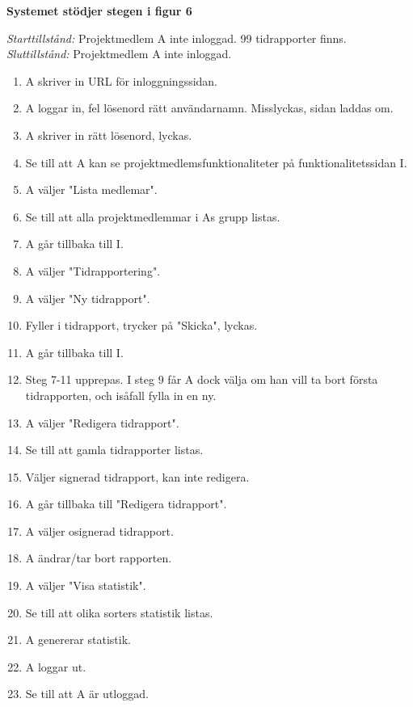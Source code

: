 \documentclass[a4paper]{article}
\begin{document}
\begin{ST}
\item
\textbf{Systemet stödjer stegen i figur 6}

\emph{Starttillstånd:} Projektmedlem A inte inloggad. 99 tidrapporter finns.\\
\emph{Sluttillstånd:} Projektmedlem A inte inloggad.\\

\begin{enumerate}

\item A skriver in URL för inloggningssidan.
\item A loggar in, fel lösenord rätt användarnamn. Misslyckas, sidan laddas om.
\item A skriver in rätt lösenord, lyckas.
\item Se till att A kan se projektmedlemsfunktionaliteter på funktionalitetssidan I.
\item A väljer "Lista medlemar".
\item Se till att alla projektmedlemmar i As grupp listas.
\item A går tillbaka till I.
\item A väljer "Tidrapportering".
\item A väljer "Ny tidrapport".
\item Fyller i tidrapport, trycker på "Skicka", lyckas.
\item A går tillbaka till I.
\item Steg 7-11 upprepas. I steg 9 får A dock välja om han vill ta bort första tidrapporten, och isåfall fylla in en ny.
\item A väljer "Redigera tidrapport".
\item Se till att gamla tidrapporter listas.
\item Väljer signerad tidrapport, kan inte redigera.
\item A går tillbaka till "Redigera tidrapport".
\item A väljer osignerad tidrapport.
\item A ändrar/tar bort rapporten.
\item A väljer "Visa statistik".
\item Se till att olika sorters statistik listas.
\item A genererar statistik.
\item A loggar ut.
\item Se till att A är utloggad.

\end {enumerate}



\end{ST}
\end{document}

